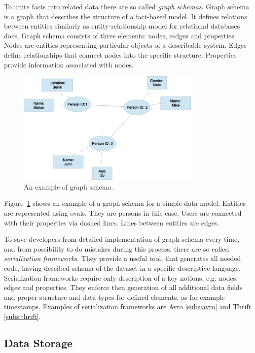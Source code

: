 To unite facts into related data there are so called \textit{graph schemas}.
Graph schema is a graph that describes the structure of a fact-based model.
It defines relations between entities similarly as entity-relationship model for relational databases does.
Graph schema consists of three elements: nodes, esdges and properties.
Nodes are entities representing particular objects of a describable system.
Edges define relationships that connect nodes into the specific structure.
Properties provide information associated with nodes.

\begin{figure}[h]
  \centering
  \includegraphics [width=0.8\textwidth]{images/GraphSchema}
  \caption{An example of graph schema.}
  \label{fig:GraphSchema}
\end{figure}

Figure~\ref{fig:GraphSchema} shows an example of a graph schema for a simple data model.
Entities are represented using ovals.
They are persons in this case.
Users are connected with their properties via dashed lines.
Lines between entities are edges.

To save developers from detailed implementation of graph schema every time, and from possibility to do mistakes during this process, there are so called \textit{serialization frameworks}.
They provide a useful tool, that generates all needed code, having descibed schema of the dataset in a specific descriptive language.
Serialization frameworks require only description of a key notions, e.g. nodes, edges and properties.
They enforce then generation of all additional data fields and proper structure and data types for defined elements, as for example timestamps.  
Examples of serialization frameworks are Avro \ref{subs:avro} and Thrift \ref{subs:thrift}.

\subsection{Data Storage}


